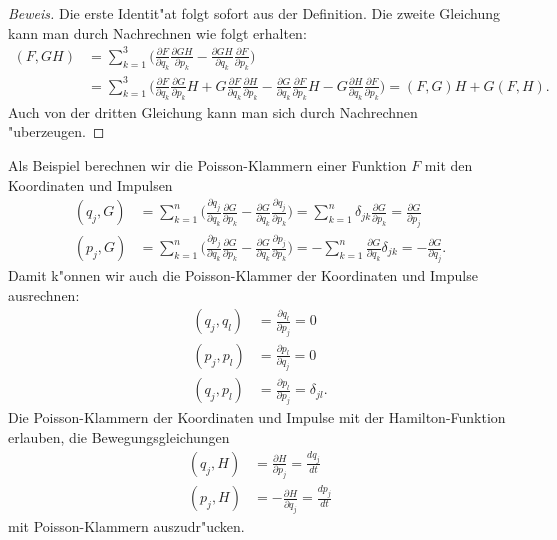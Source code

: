\begin{proof}[Beweis]
Die erste Identit"at folgt sofort aus der Definition.
Die zweite Gleichung kann man durch Nachrechnen wie folgt erhalten:
\begin{align*}
(F,GH)
&=
\sum_{k=1}^3 \biggl(
\frac{\partial F}{\partial q_k}\frac{\partial GH}{\partial p_k}
-
\frac{\partial GH}{\partial q_k}\frac{\partial F}{\partial p_k}
\biggr)
\\
&=
\sum_{k=1}^3 \biggl(
\frac{\partial F}{\partial q_k}\frac{\partial G}{\partial p_k}H
+
G\frac{\partial F}{\partial q_k}\frac{\partial H}{\partial p_k}
-
\frac{\partial G}{\partial q_k}\frac{\partial F}{\partial p_k}H
-
G\frac{\partial H}{\partial q_k}\frac{\partial F}{\partial p_k}
\biggr)
=(F,G)H + G(F,H).
\end{align*}
Auch von der dritten Gleichung kann man sich durch Nachrechnen
"uberzeugen.
\end{proof}

Als Beispiel berechnen wir die Poisson-Klammern einer Funktion $F$
mit den Koordinaten und Impulsen
\begin{align*}
(q_j,G)
&=
\sum_{k=1}^n\biggl(
\frac{\partial q_j}{\partial q_k}\frac{\partial G}{\partial p_k}
-
\frac{\partial G}{\partial q_k}\frac{\partial q_j}{\partial p_k}
\biggr)
=
\sum_{k=1}^n\delta_{jk}\frac{\partial G}{\partial p_k}
=
\frac{\partial G}{\partial p_j}
\\
(p_j,G)
&=
\sum_{k=1}^n\biggl(
\frac{\partial p_j}{\partial q_k}\frac{\partial G}{\partial p_k}
-
\frac{\partial G}{\partial q_k}\frac{\partial p_j}{\partial p_k}
\biggr)
=
-\sum_{k=1}^n
\frac{\partial G}{\partial q_k}\delta_{jk}
=
-\frac{\partial G}{\partial q_j}.
\end{align*}
Damit k"onnen wir auch die Poisson-Klammer der Koordinaten und Impulse
ausrechnen:
\begin{align*}
(q_j,q_l)
&=
\frac{\partial q_l}{\partial p_j}
=
0
\\
(p_j,p_l)
&=
\frac{\partial p_l}{\partial q_j}
=
0
\\
(q_j,p_l)
&=
\frac{\partial p_l}{\partial p_j}
=\delta_{jl}.
\end{align*}
Die Poisson-Klammern der Koordinaten und Impulse mit der Hamilton-Funktion
erlauben, die Bewegungsgleichungen
\begin{align*}
(q_j,H)
&=
\frac{\partial H}{\partial p_j} = \frac{dq_j}{dt}
\\
(p_j,H)
&=
-\frac{\partial H}{\partial q_j} = \frac{dp_j}{dt}
\end{align*}
mit Poisson-Klammern auszudr"ucken.

